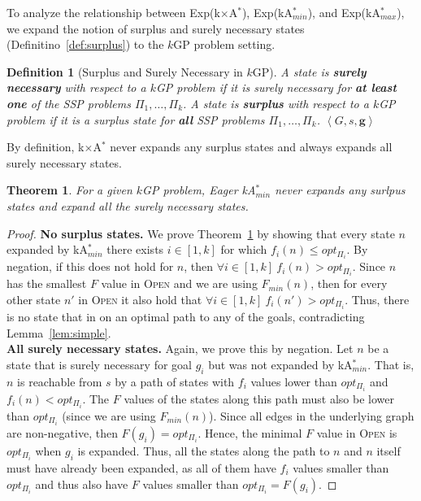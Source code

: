 \documentclass{aicom2e}
\newtheorem{definition}{Definition}
\newtheorem{theorem}{Theorem}
\newcommand{\kgs}{$k$GP}
\newcommand{\kastarmin}{kA$^*_{min}$}
\newcommand{\kastarmax}{kA$^*_{max}$}
\newcommand{\kxastar}{k$\times$A$^*$}
\newcommand{\minf}{$F_{min}(n)$}
\newcommand{\tuple}[1]{\ensuremath{\left \langle #1 \right \rangle }}
\newcommand{\open}{\textsc{Open}}
\begin{document}
To analyze the relationship between Exp(\kxastar{}), Exp(\kastarmin), and Exp(\kastarmax), we expand the notion of surplus and surely necessary states (Definitino~\ref{def:surplus}) to the \kgs{} problem setting.
\begin{definition}[Surplus and Surely Necessary in \kgs{}]
    A state is {\bf surely necessary} with respect to a \kgs{} problem
    if it is surely necessary for {\bf at least one} of the SSP problems $\Pi_1,\ldots, \Pi_k$.
    A state is {\bf surplus} with respect to a \kgs{} problem
    if it is a surplus state for {\bf all} SSP problems $\Pi_1,\ldots, \Pi_k$.
    $\tuple{G,s, \textbf{g}}$
\label{def:surplus-k-goal}
\end{definition}
By definition, \kxastar{} never expands any surplus states and always expands
all surely necessary states.


\begin{theorem}
    For a given \kgs{} problem, Eager \kastarmin{} never expands any surlpus states and
    expand all the surely necessary states.
    \label{the:kastarmin-effective}
\end{theorem}
\begin{proof}
{\bf No surplus states.}    We prove Theorem~\ref{the:kastarmin-effective} by showing that every state $n$
    expanded by \kastarmin{} there exists $i\in [1,k]$ for which $f_i(n)\leq opt_{\Pi_i}$.
    By negation, if this does not hold for $n$, then $\forall i\in[1,k]~f_i(n)>opt_{\Pi_i}$.
    Since $n$ has the smallest $F$ value in \open{} and we are using \minf{}, then
    for every other state $n'$ in \open{} it also hold that $\forall i\in[1,k]~f_i(n')>opt_{\Pi_i}$.
    Thus, there is no state that in on an optimal path to any of the goals, contradicting Lemma~\ref{lem:simple}. \\

    {\bf All surely necessary states.} Again, we prove this by negation. Let $n$ be a state
    that is surely necessary for goal $g_i$ but was not expanded by \kastarmin{}.
    That is, $n$ is reachable from $s$ by a path of states with $f_i$  values lower than $opt_{\Pi_i}$
    and $f_i(n)<opt_{\Pi_i}$. The $F$ values of the states along this path must also be lower than
$opt_{\Pi_i}$ (since we are using \minf). Since all edges in the underlying
graph are non-negative, then $F(g_i)=opt_{\Pi_i}$. Hence, the minimal $F$ value in \open{} is $opt_{\Pi_i}$ when $g_i$ is expanded. Thus, all the states along the path to $n$ and $n$ itself must have already been expanded, as all of them have $f_i$ values smaller than $opt_{\Pi_i}$ and thus also have $F$ values smaller than $opt_{\Pi_i}=F(g_i)$.  
\end{proof}
\end{document}

